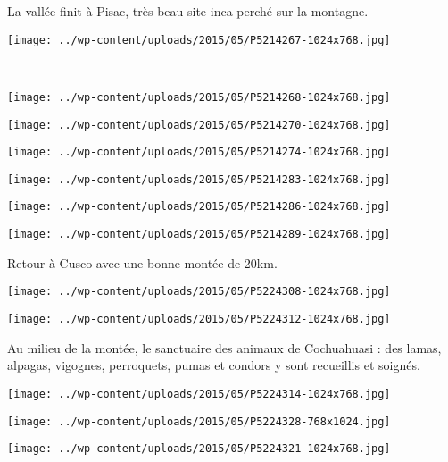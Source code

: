 La vallée finit à Pisac, très beau site inca perché sur la montagne. 
\begin{center} \texttt{[image: ../wp-content/uploads/2015/05/P5214267-1024x768.jpg]} \end{center}
~\\
\begin{center} \texttt{[image: ../wp-content/uploads/2015/05/P5214268-1024x768.jpg]} \end{center}
\begin{center} \texttt{[image: ../wp-content/uploads/2015/05/P5214270-1024x768.jpg]} \end{center}
\begin{center} \texttt{[image: ../wp-content/uploads/2015/05/P5214274-1024x768.jpg]} \end{center}
\begin{center} \texttt{[image: ../wp-content/uploads/2015/05/P5214283-1024x768.jpg]} \end{center}
\begin{center} \texttt{[image: ../wp-content/uploads/2015/05/P5214286-1024x768.jpg]} \end{center}
\begin{center} \texttt{[image: ../wp-content/uploads/2015/05/P5214289-1024x768.jpg]} \end{center}

Retour à Cusco avec une bonne montée de 20km. 
\begin{center} \texttt{[image: ../wp-content/uploads/2015/05/P5224308-1024x768.jpg]} \end{center}
\begin{center} \texttt{[image: ../wp-content/uploads/2015/05/P5224312-1024x768.jpg]} \end{center}

Au milieu de la montée, le sanctuaire des animaux de Cochuahuasi : des lamas, alpagas, vigognes, perroquets, pumas et condors y sont recueillis et soignés. 
\begin{center} \texttt{[image: ../wp-content/uploads/2015/05/P5224314-1024x768.jpg]} \end{center}
\begin{center} \texttt{[image: ../wp-content/uploads/2015/05/P5224328-768x1024.jpg]} \end{center}
\vfill
\begin{center} \texttt{[image: ../wp-content/uploads/2015/05/P5224321-1024x768.jpg]} \end{center}
\vspace{-\topsep}
\vspace{-0.75mm}
